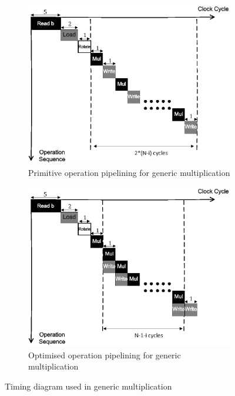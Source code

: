 \documentclass[runningheads]{llncs}
\begin{document}
\begin{figure}[!tb]
\centering
\begin{subfigure}[t]{0.47\textwidth}\centering
\includegraphics[width=\textwidth]{./fig/pipeline_dsnmul.eps}
\caption{Primitive operation pipelining for generic multiplication}
\label{fig:pipeline_gmul}
\end{subfigure}
\hspace{1em}
\begin{subfigure}[t]{0.47\textwidth}\centering
\includegraphics[width=\textwidth]{./fig/pipeline_dsnmul2.eps}
\caption{Optimised operation pipelining for generic multiplication }
\label{fig:pipeline_gmul2}
\end{subfigure}
\caption{Timing diagram used in generic multiplication}
\end{figure}
\end{document}
